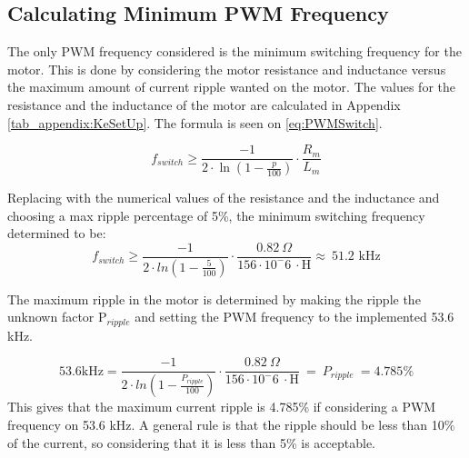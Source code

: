 \subsection{Calculating Minimum PWM Frequency}
The only PWM frequency considered is the minimum switching frequency for the motor. This is done by considering the motor resistance and inductance versus the maximum amount of current ripple wanted on the motor. The values for the resistance and the inductance of the motor are calculated in Appendix \ref{tab_appendix:KeSetUp}. The formula is seen on \autoref{eq:PWMSwitch}.

\begin{equation}
f_{switch} \geq \frac{-1}{2\cdot \ln(1-\frac{p}{100})}\cdot\frac{R_{m}}{L_{m}}
\label{eq:PWMSwitch}
\end{equation}
\startexplain
\stopexplain

Replacing with the numerical values of the resistance and the inductance and choosing a max ripple percentage of 5\%, the minimum switching frequency determined to be:
\begin{equation}
    f_{switch} \geq \frac{-1}{2 \cdot ln(1-\frac{5}{100})}\cdot\frac{0.82\ \Omega}{156\cdot10^-6 \ \cdot \text{H}} \approx \ 51.2 \text{ kHz}
\end{equation}

The maximum ripple in the motor is determined by making the ripple the unknown factor P$_{ripple}$ and setting the PWM frequency to the implemented 53.6 kHz.  

\begin{equation}
    53.6 \text{kHz} = \frac{-1}{2 \cdot ln(1-\frac{P_{ripple}}{100})}\cdot\frac{0.82\ \Omega}{156\cdot10^-6 \ \cdot \text{H}}\ =\ P_{ripple}\ = 4.785\%  
\end{equation}
This gives that the maximum current ripple is 4.785\% if considering a PWM frequency on 53.6 kHz. A general rule is that the ripple should be less than 10\% of the current, so considering that it is less than 5\% is acceptable.


 

